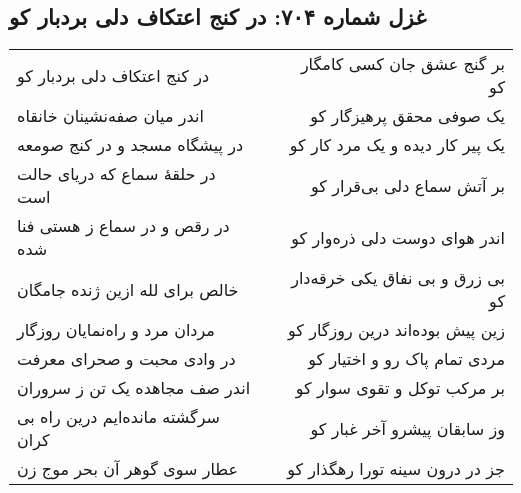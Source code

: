 \begin{center}
\section*{غزل شماره ۷۰۴: در کنج اعتکاف دلی بردبار کو}
\label{sec:704}
\begin{longtable}{l p{0.5cm} r}
در کنج اعتکاف دلی بردبار کو
&&
بر گنج عشق جان کسی کامگار کو
\\
اندر میان صفه‌نشینان خانقاه
&&
یک صوفی محقق پرهیزگار کو
\\
در پیشگاه مسجد و در کنج صومعه
&&
یک پیر کار دیده و یک مرد کار کو
\\
در حلقهٔ سماع که دریای حالت است
&&
بر آتش سماع دلی بی‌قرار کو
\\
در رقص و در سماع ز هستی فنا شده
&&
اندر هوای دوست دلی ذره‌وار کو
\\
خالص برای لله ازین ژنده جامگان
&&
بی زرق و بی نفاق یکی خرقه‌دار کو
\\
مردان مرد و راه‌نمایان روزگار
&&
زین پیش بوده‌اند درین روزگار کو
\\
در وادی محبت و صحرای معرفت
&&
مردی تمام پاک رو و اختیار کو
\\
اندر صف مجاهده یک تن ز سروران
&&
بر مرکب توکل و تقوی سوار کو
\\
سرگشته مانده‌ایم درین راه بی کران
&&
وز سابقان پیشرو آخر غبار کو
\\
عطار سوی گوهر آن بحر موج زن
&&
جز در درون سینه تورا رهگذار کو
\\
\end{longtable}
\end{center}
